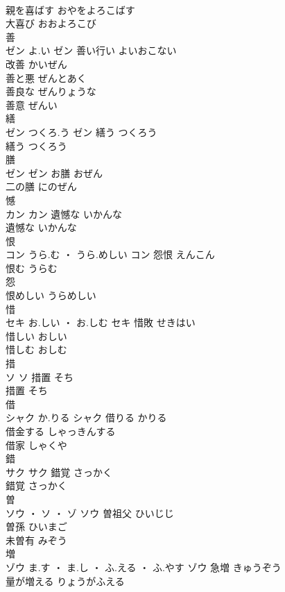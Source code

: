 \documentclass[8pt]{extreport}
\begin{document}
\begin{CJK}{UTF8}{min}
\\	親を喜ばす	おやをよろこばす	
\\	大喜び	おおよろこび	
\\	善	
\\	ゼン	よ.い	ゼン	善い行い	よいおこない	
\\	改善	かいぜん	
\\	善と悪	ぜんとあく	
\\	善良な	ぜんりょうな	
\\	善意	ぜんい	
\\	繕	
\\	ゼン	つくろ.う	ゼン	繕う	つくろう	
\\	繕う	つくろう	
\\	膳	
\\	ゼン		ゼン	お膳	おぜん	
\\	二の膳	にのぜん	
\\	憾	
\\	カン		カン	遺憾な	いかんな	
\\	遺憾な	いかんな	
\\	恨	
\\	コン	うら.む ・ うら.めしい	コン	怨恨	えんこん	
\\	恨む	うらむ	
\\	怨 
\\	恨めしい	うらめしい	
\\	惜	
\\	セキ	お.しい ・ お.しむ	セキ	惜敗	せきはい	
\\	惜しい	おしい	
\\	惜しむ	おしむ	
\\	措	
\\	ソ		ソ	措置	そち	
\\	措置	そち	
\\	借	
\\	シャク	か.りる	シャク	借りる	かりる	
\\	借金する	しゃっきんする	
\\	借家	しゃくや	
\\	錯	
\\	サク		サク	錯覚	さっかく	
\\	錯覚	さっかく	
\\	曽	
\\	ソウ ・ ソ ・ ゾ		ソウ													曽祖父	ひいじじ	
\\	曽孫	ひいまご	
\\	未曽有	みぞう	
\\	増	
\\	ゾウ	ま.す ・ ま.し ・ ふ.える ・ ふ.やす	ゾウ	急増	きゅうぞう	
\\	量が増える	りょうがふえる	

\end{CJK}
\end{document}
